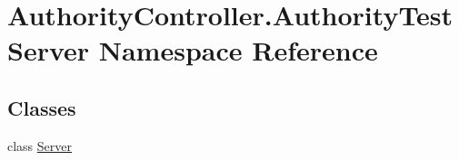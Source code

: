 \hypertarget{namespace_authority_controller_1_1_authority_test_server}{}\section{Authority\+Controller.\+Authority\+Test\+Server Namespace Reference}
\label{namespace_authority_controller_1_1_authority_test_server}
\subsection*{Classes}
\begin{DoxyCompactItemize}
\item 
class \mbox{\hyperlink{class_authority_controller_1_1_authority_test_server_1_1_server}{Server}}
\end{DoxyCompactItemize}
